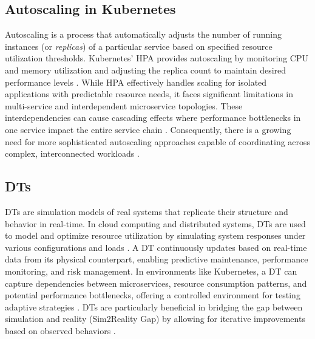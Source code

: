 \documentclass[conference]{IEEEtran}
\begin{document}
\subsection{Autoscaling in Kubernetes}
Autoscaling is a process that automatically adjusts the number of running instances (or \textit{replicas}) of a particular service based on specified resource utilization thresholds. Kubernetes' HPA provides autoscaling by monitoring CPU and memory utilization and adjusting the replica count to maintain desired performance levels \cite{hpa_design}. While HPA effectively handles scaling for isolated applications with predictable resource needs, it faces significant limitations in multi-service and interdependent microservice topologies. These interdependencies can cause cascading effects where performance bottlenecks in one service impact the entire service chain \cite{park_predictive_scaling}. Consequently, there is a growing need for more sophisticated autoscaling approaches capable of coordinating across complex, interconnected workloads \cite{liu_dt_cloud}.

\subsection{DTs}
DTs are simulation models of real systems that replicate their structure and behavior in real-time. In cloud computing and distributed systems, DTs are used to model and optimize resource utilization by simulating system responses under various configurations and loads \cite{schleich_digital_twin}. A DT continuously updates based on real-time data from its physical counterpart, enabling predictive maintenance, performance monitoring, and risk management. In environments like Kubernetes, a DT can capture dependencies between microservices, resource consumption patterns, and potential performance bottlenecks, offering a controlled environment for testing adaptive strategies \cite{zhang_marl_k8s}. DTs are particularly beneficial in bridging the gap between simulation and reality (Sim2Reality Gap) by allowing for iterative improvements based on observed behaviors \cite{nguyen_sim2reality}.
\end{document}
